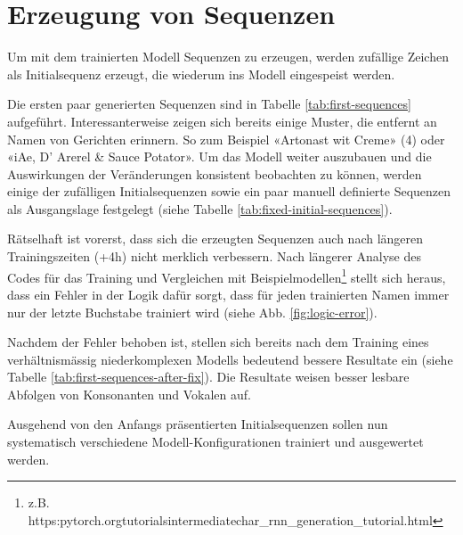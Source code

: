 \section{Erzeugung von Sequenzen}
\label{sec:model-generation}

Um mit dem trainierten Modell Sequenzen zu erzeugen, werden zufällige Zeichen als Initialsequenz erzeugt, die
wiederum ins Modell eingespeist werden.

Die ersten paar generierten Sequenzen sind in Tabelle \ref{tab:first-sequences} aufgeführt.
Interessanterweise zeigen sich bereits einige Muster, die entfernt an Namen von Gerichten erinnern.
So zum Beispiel «Artonast wit Creme» (4) oder «iAe, D' Arerel \& Sauce Potator».
Um das Modell weiter auszubauen und die Auswirkungen der Veränderungen konsistent beobachten zu können,
werden einige der zufälligen Initialsequenzen sowie ein paar manuell definierte Sequenzen als Ausgangslage
festgelegt (siehe Tabelle \ref{tab:fixed-initial-sequences}).

Rätselhaft ist vorerst, dass sich die erzeugten Sequenzen auch nach längeren Trainingszeiten (+4h) nicht merklich verbessern.
Nach längerer Analyse des Codes für das Training und Vergleichen mit Beispielmodellen\footnote{z.B. https:\/\/pytorch.org\/tutorials\/intermediate\/char\_rnn\_generation\_tutorial.html}
stellt sich heraus, dass ein Fehler in der Logik dafür sorgt, dass für jeden trainierten Namen immer nur der letzte Buchstabe trainiert wird (siehe Abb. \ref{fig:logic-error}).

Nachdem der Fehler behoben ist, stellen sich bereits nach dem Training eines verhältnismässig niederkomplexen Modells bedeutend bessere Resultate ein (siehe Tabelle \ref{tab:first-sequences-after-fix}).
Die Resultate weisen besser lesbare Abfolgen von Konsonanten und Vokalen auf.

Ausgehend von den Anfangs präsentierten Initialsequenzen sollen nun systematisch verschiedene Modell-Konfigurationen trainiert und
ausgewertet werden.

